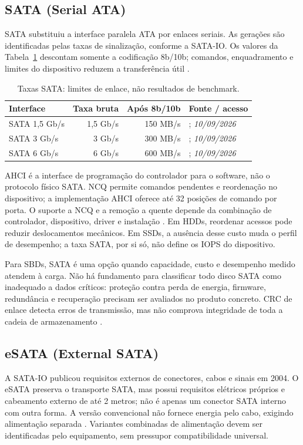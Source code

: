\documentclass[titlepage]{article}
\newcommand{\acesso}{\textit{10/09/2026}}
\begin{document}
\subsection{SATA (Serial ATA)}
SATA substituiu a interface paralela ATA por enlaces seriais. As gerações são identificadas pelas taxas de sinalização, conforme a SATA-IO. Os valores da Tabela~\ref{tab:sata_geracoes} descontam somente a codificação 8b/10b; comandos, enquadramento e limites do dispositivo reduzem a transferência útil \cite{sata_io_naming,sata_esata}.
\begin{table}[htbp]
\centering\small
\begin{tabularx}{\textwidth}{lrrX}
\toprule
Interface & Taxa bruta & Após 8b/10b & Fonte / acesso \\
\midrule
SATA 1,5 Gb/s & 1,5 Gb/s & 150 MB/s & \cite{sata_io_naming,sata_esata}; \acesso \\
SATA 3 Gb/s & 3 Gb/s & 300 MB/s & \cite{sata_io_naming,sata_esata}; \acesso \\
SATA 6 Gb/s & 6 Gb/s & 600 MB/s & \cite{sata_io_naming}; \acesso \\
\bottomrule
\end{tabularx}
\caption{Taxas SATA: limites de enlace, não resultados de benchmark.}
\label{tab:sata_geracoes}
\end{table}

AHCI é a interface de programação do controlador para o software, não o protocolo físico SATA. NCQ permite comandos pendentes e reordenação no dispositivo; a implementação AHCI oferece até 32 posições de comando por porta. O suporte a NCQ e a remoção a quente depende da combinação de controlador, dispositivo, driver e instalação \cite{intel_ahci}. Em HDDs, reordenar acessos pode reduzir deslocamentos mecânicos. Em SSDs, a ausência desse custo muda o perfil de desempenho; a taxa SATA, por si só, não define os IOPS do dispositivo.

Para SBDs, SATA é uma opção quando capacidade, custo e desempenho medido atendem à carga. Não há fundamento para classificar todo disco SATA como inadequado a dados críticos: proteção contra perda de energia, firmware, redundância e recuperação precisam ser avaliados no produto concreto. CRC de enlace detecta erros de transmissão, mas não comprova integridade de toda a cadeia de armazenamento \cite{snia_dictionary}.

\subsection{eSATA (External SATA)}
A SATA-IO publicou requisitos externos de conectores, cabos e sinais em 2004. O eSATA preserva o transporte SATA, mas possui requisitos elétricos próprios e cabeamento externo de até 2 metros; não é apenas um conector SATA interno com outra forma. A versão convencional não fornece energia pelo cabo, exigindo alimentação separada \cite{sata_esata}. Variantes combinadas de alimentação devem ser identificadas pelo equipamento, sem pressupor compatibilidade universal.
\end{document}
